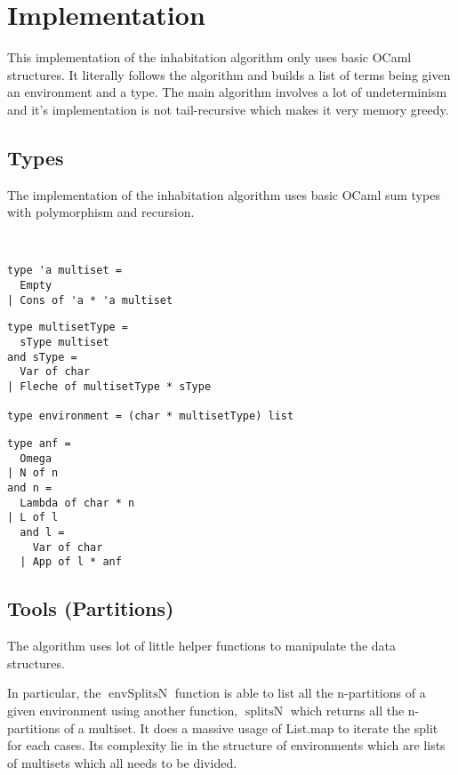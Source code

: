 \documentclass{article}
\DeclareMathOperator{\ienvSPlit}{envSplitsN}
\DeclareMathOperator{\isplit}{splitsN}
\begin{document}
\section{Implementation}
This implementation of the inhabitation algorithm only uses basic OCaml structures. It literally follows the algorithm and builds a list of terms being given an environment and a type. The main algorithm involves a lot of undeterminism and it's implementation is not tail-recursive which makes it very memory greedy.

\subsection{Types}
The implementation of the inhabitation algorithm uses basic OCaml sum types with polymorphism and recursion. 

\
\begin{lstlisting}[caption={Multisets}]
type 'a multiset =
  Empty
| Cons of 'a * 'a multiset
\end{lstlisting}

\begin{lstlisting}[caption={Intersection types and environments}]
type multisetType = 
  sType multiset
and sType = 
  Var of char
| Fleche of multisetType * sType

type environment = (char * multisetType) list
\end{lstlisting}

\begin{lstlisting}[caption={Approximate normal forms}]
type anf = 
  Omega
| N of n
and n = 
  Lambda of char * n
| L of l
  and l =
    Var of char
  | App of l * anf
\end{lstlisting}


\subsection{Tools (Partitions)}
The algorithm uses lot of little helper functions to manipulate the data structures.

In particular, the $\ienvSPlit$ function is able to list all the n-partitions of a given environment using another function, $\isplit$ which returns all the n-partitions of a multiset. It does a massive usage of List.map to iterate the split for each cases. Its complexity lie in the structure of environments which are lists of multisets which all needs to be divided.
\end{document}
